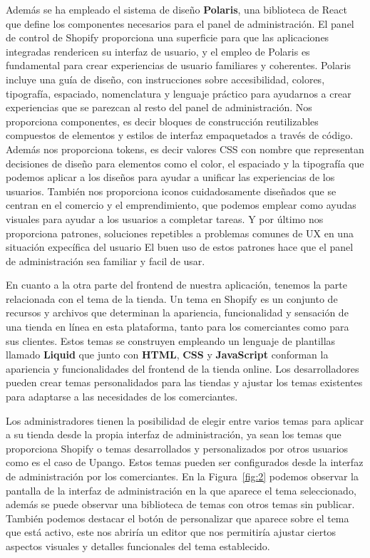 \documentclass[12pt]{article}
\begin{document}
Además se ha empleado el sistema de diseño \textbf{Polaris}, una biblioteca de React que define los componentes necesarios para el panel de administración.
El panel de control de Shopify proporciona una superficie para que las aplicaciones integradas rendericen su interfaz de usuario, y el empleo de Polaris
es fundamental para crear experiencias de usuario familiares y coherentes.
Polaris incluye una guía de diseño, con instrucciones sobre accesibilidad, colores, tipografía, espaciado, nomenclatura y lenguaje práctico para ayudarnos 
a crear experiencias que se parezcan al resto del panel de administración. Nos proporciona componentes, es decir bloques de construcción reutilizables compuestos de 
elementos y estilos de interfaz empaquetados a través de código. Además nos proporciona tokens, es decir valores CSS con nombre que representan decisiones
de diseño para elementos como el color, el espaciado y la tipografía que podemos aplicar a los diseños para ayudar a unificar las experiencias de los usuarios.
También nos proporciona iconos cuidadosamente diseñados que se centran en el comercio y el emprendimiento, que podemos emplear como ayudas visuales para ayudar a los 
usuarios a completar tareas. Y por último nos proporciona patrones, soluciones repetibles a problemas comunes de UX en una situación expecífica del usuario
El buen uso de estos patrones hace que el panel de administración sea familiar y facil de usar. \cite{shopify-dev}

En cuanto a la otra parte del frontend de nuestra aplicación, tenemos la parte relacionada con el tema de la tienda. Un tema en Shopify es un conjunto de recursos
y archivos que determinan la apariencia, funcionalidad y sensación de una tienda en línea en esta plataforma, tanto para los comerciantes como para
sus clientes. Estos temas se construyen empleando un lenguaje de plantillas llamado \textbf{Liquid} que junto con \textbf{HTML}, \textbf{CSS} y \textbf{JavaScript} conforman la apariencia
y funcionalidades del frontend de la tienda online. Los desarrolladores pueden crear temas personalidados para las tiendas y ajustar los temas existentes 
para adaptarse a las necesidades de los comerciantes. \cite{shopify-dev}

Los administradores tienen la posibilidad de elegir entre varios temas para aplicar a su tienda desde la propia interfaz de administración,
ya sean los temas que proporciona Shopify o temas desarrollados y personalizados por otros usuarios como es el caso de Upango. Estos temas pueden ser
configurados desde la interfaz de administración por los comerciantes.
En la Figura~\ref{fig:2} podemos observar la pantalla de la interfaz de administración en la que aparece el tema seleccionado, además se puede observar una 
biblioteca de temas con otros temas sin publicar. También podemos destacar el botón de personalizar que aparece
sobre el tema que está activo, este nos abriría un editor que nos permitiría ajustar ciertos aspectos visuales y detalles funcionales del tema establecido.
\end{document}
